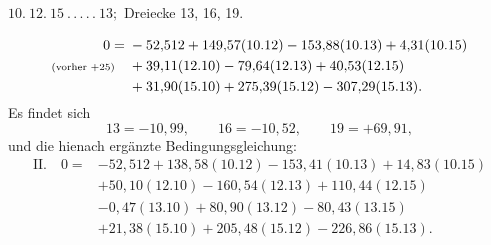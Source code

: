 \par\bigskip
\begin{center}
$10.\ 12.\ 15\ .\,.\,.\,.\,.\ 13;$ Dreiecke 13, 16, 19.
\end{center}
\[
\begin{aligned}
0={}&-52{,}512+149{,}57(10.12)-153{,}88(10.13)+4{,}31(10.15)\\
\text{\scriptsize(vorher $+25$)}\quad&+39{,}11(12.10)-79{,}64(12.13)+40{,}53(12.15)\\
&+31{,}90(15.10)+275{,}39(15.12)-307{,}29(15.13).
\end{aligned}
\]
Es findet sich
\[
13=-10{,}99,\qquad16=-10{,}52,\qquad19=+69{,}91,
\]
und die hienach ergänzte Bedingungsgleichung:
\[
\begin{aligned}
\mathrm{II.}\quad 0={}&-52{,}512+138{,}58(10.12)-153{,}41(10.13)+14{,}83(10.15)\\
&+50{,}10(12.10)-160{,}54(12.13)+110{,}44(12.15)\\
&-0{,}47(13.10)+80{,}90(13.12)-80{,}43(13.15)\\
&+21{,}38(15.10)+205{,}48(15.12)-226{,}86(15.13).
\end{aligned}
\]
